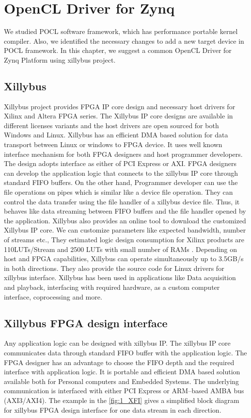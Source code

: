 \chapter{OpenCL Driver for Zynq}
\label{ch4_OpenCL_Driver_for_Zynq}

We studied POCL software framework, which has performance portable kernel compiler. Also, we identified the necessary changes to add a new target device in POCL framework. In this chapter, we suggest a common OpenCL Driver for Zynq Platform using xillybus project. 

\section{Xillybus}
Xillybus project provides FPGA IP core design and necessary host drivers for Xilinx and Altera FPGA series. The Xillybus IP core designs are available in different licenses variants and the host drivers are open sourced for both Windows and Linux. Xillybus has an efficient DMA based solution for data transport between Linux or windows to FPGA device. It uses well known interface mechanism for both FPGA designers and host programmer developers. The design adopts interface as either of PCI Express or AXI. FPGA designers can develop the application logic that connects to the xillybus IP core through standard FIFO buffers. On the other hand, Programmer developer can use the file operations on pipes which is similar like a device file operation. They can control the data transfer using the file handler of a xillybus device file. Thus, it behaves like data streaming between FIFO buffers and the file handler opened by the application. Xillybus also provides an online tool to download the customized Xillybus IP core. We can customize parameters like expected bandwidth, number of streams etc., They estimated logic design consumption for Xilinx products are 110LUTs/Stream and 2500 LUTs with small number of RAMs  \cite{21}. Depending on host and FPGA capabilities, Xillybus can operate simultaneously up to 3.5GB/s in both directions. They also provide the source code for Linux drivers for xillybus interface. Xillybus has been used in applications like Data acquisition and playback, interfacing with required hardware, as a custom computer interface, coprocessing and more.

\section{Xillybus FPGA design interface}
Any application logic can be designed with xillybus IP. The xillybus IP core communicates data through standard FIFO buffer with the application logic. The FPGA designer has an advantage to choose the FIFO depth and the required interface with application logic. It is portable and efficient DMA based solution available both for Personal computers and Embedded Systems. The underlying communication is interfaced with either PCI Express or ARM--based AMBA bus (AXI3/AXI4). The example in the \ref{fig:1_XFI} \cite{22} gives a simplified block diagram for xillybus FPGA design interface for one data stream in each direction.


